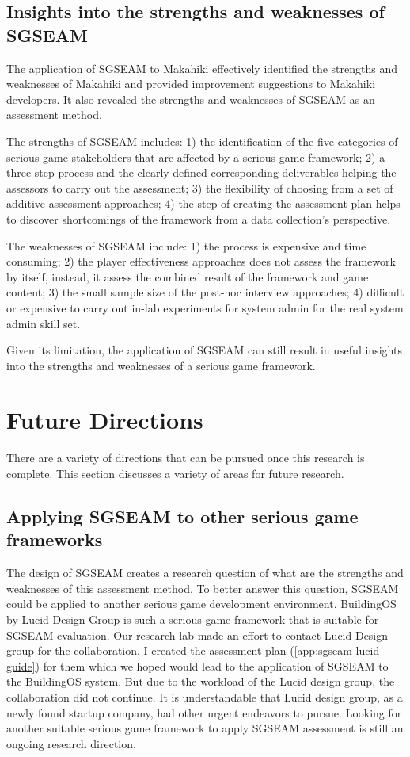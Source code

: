 \subsection{Insights into the strengths and weaknesses of SGSEAM}

The application of SGSEAM to Makahiki effectively identified the strengths and weaknesses of Makahiki and provided improvement suggestions to Makahiki developers. It also revealed the strengths and weaknesses of SGSEAM as an assessment method. 

The strengths of SGSEAM includes: 1) the identification of the five categories of serious game stakeholders that are affected by a serious game framework; 2) a three-step process and the clearly defined corresponding deliverables helping the assessors to carry out the assessment; 3) the flexibility of choosing from a set of additive assessment approaches; 4) the step of creating the assessment plan helps to discover shortcomings of the framework from a data collection's perspective.

The weaknesses of SGSEAM include: 1) the process is expensive and time consuming; 2) the player effectiveness approaches does not assess the framework by itself, instead, it assess the combined result of the framework and game content; 3) the small sample size of the post-hoc interview approaches; 4) difficult or expensive to carry out in-lab experiments for system admin for the real system admin skill set.

Given its limitation, the application of SGSEAM can still result in useful insights into the strengths and weaknesses of a serious game framework.

\section{Future Directions}

There are a variety of directions that can be pursued once this research is complete. This section discusses a variety of areas for future research.

\subsection{Applying SGSEAM to other serious game frameworks}
\label{future:other-framework}

The design of SGSEAM creates a research question of what are the strengths and weaknesses of this assessment method. To better answer this question, SGSEAM could be applied to another serious game development environment. BuildingOS\cite{building-dashboard} by Lucid Design Group is such a serious game framework that is suitable for SGSEAM evaluation. Our research lab made an effort to contact Lucid Design group for the collaboration. I created the assessment plan (\autoref{app:sgseam-lucid-guide}) for them which we hoped would lead to the application of SGSEAM to the BuildingOS system. But due to the workload of the Lucid design group, the collaboration did not continue. It is understandable that Lucid design group, as a newly found startup company, had other urgent endeavors to pursue. Looking for another suitable serious game framework to apply SGSEAM assessment is still an ongoing research direction.

